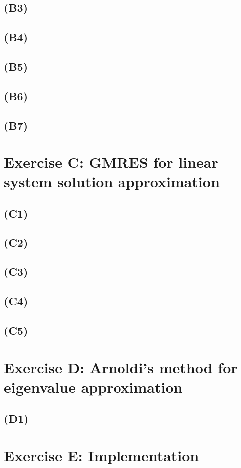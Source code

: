 \documentclass{article}
\begin{document}
\subsection*{(B3)}


\subsection*{(B4)}


\subsection*{(B5)}


\subsection*{(B6)}


\subsection*{(B7)}

\newpage
\section{Exercise C: GMRES for linear system solution approximation}
\subsection*{(C1)}
\subsection*{(C2)}
\subsection*{(C3)}
\subsection*{(C4)}
\subsection*{(C5)}

\section{Exercise D: Arnoldi’s method for eigenvalue approximation}
\subsection*{(D1)}

\section{Exercise E: Implementation}
\end{document}
